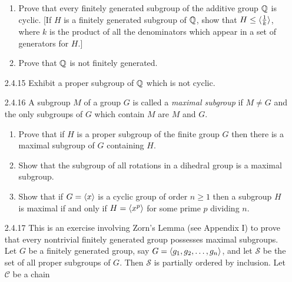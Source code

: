 \begin{enumerate}
\begin{enumerate}
                     \item Prove that every finitely generated subgroup of the
                           additive group $\mathbb{Q}$ is cyclic. [If $H$ is a finitely
                           generated subgroup of $\mathbb{Q}$, show that
                           $H \le \langle \frac{1}{k} \rangle$, where $k$ is the product
                           of all the denominators which appear in a set of
                           generators for $H$.]
                     \item Prove that $\mathbb{Q}$ is not finitely generated.
                  \end{enumerate}
   \item[2.4.15]  Exhibit a proper subgroup of $\mathbb{Q}$ which is not cyclic.
   \item[2.4.16]  A subgroup $M$ of a group $G$ is called a
                  \textit{maximal subgroup} if $M \neq G$ and the only subgroups
                  of $G$ which contain $M$ are $M$ and $G$.
                  \begin{enumerate}
                     \item Prove that if $H$ is a proper subgroup of the finite
                           group $G$ then there is a maximal subgroup of $G$
                           containing $H$.
                     \item Show that the subgroup of all rotations in a dihedral
                           group is a maximal subgroup.
                     \item Show that if $G = \langle x \rangle$ is a cyclic group of order
                           $n \ge 1$ then a subgroup $H$ is maximal if and only
                           if $H = \langle x^p \rangle$ for some prime $p$ dividing $n$.
                  \end{enumerate}
   \item[2.4.17]  This is an exercise involving Zorn's Lemma (see Appendix I) to
                  prove that every nontrivial finitely generated group possesses
                  maximal subgroups. Let $G$ be a finitely generated group, say
                  $G = \langle g_1, g_2, \ldots, g_n \rangle$, and let $\mathcal{S}$ be
                  the set of all proper subgroups of $G$. Then $\mathcal{S}$ is
                  partially ordered by inclusion. Let $\mathcal{C}$ be a chain

\end{enumerate}

